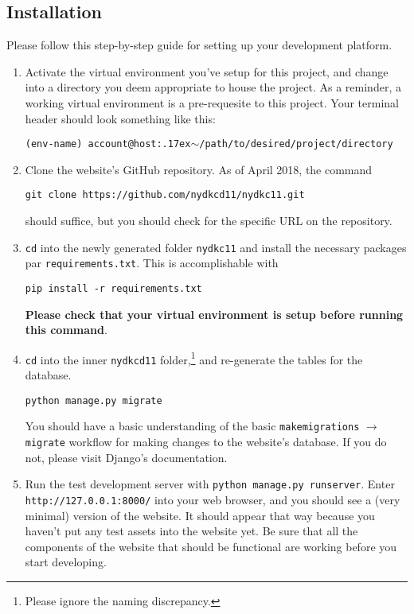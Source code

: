 \documentclass[hidelinks]{article}
\newcommand{\snippet}[1]{{\centering\texttt{#1}\par}}
\newcommand{\tilda}{{\raise.17ex\hbox{$\scriptstyle\mathtt{\sim}$}}}
\begin{document}
\subsection{Installation}

Please follow this step-by-step guide for setting up your development platform.

\begin{enumerate}
\item Activate the virtual environment you've setup for this project, and change into a directory you deem appropriate to house the project.
As a reminder, a working virtual environment is a pre-requesite to this project. 
Your terminal header should look something like this:

\snippet{(env-name) account@host:\tilda{}/path/to/desired/project/directory}

\item Clone the website's GitHub repository. As of April 2018, the command

\snippet{git clone https://github.com/nydkcd11/nydkc11.git}

should suffice, but you should check for the specific URL on the repository. 

\item \texttt{cd} into the newly generated folder \texttt{nydkc11} and install the necessary packages par \texttt{requirements.txt}. 
This is accomplishable with

\snippet{pip install -r requirements.txt}

\textbf{Please check that your virtual environment is setup before running this command}.

\item \texttt{cd} into the inner \texttt{nydkcd11} folder,\footnote{Please ignore the naming discrepancy.} and re-generate the tables for the database. 

\snippet{python manage.py migrate}

You should have a basic understanding of the basic \texttt{makemigrations} $\to$ \texttt{migrate} workflow for making changes to the website's database.
If you do not, please visit Django's documentation.

\item Run the test development server with \texttt{python manage.py runserver}. 
Enter \texttt{http://127.0.0.1:8000/} into your web browser, and you should see a (very minimal) version of the website.
It should appear that way because you haven't put any test assets into the website yet.
Be sure that all the components of the website that should be functional are working before you start developing.

\end{enumerate}
\end{document}
